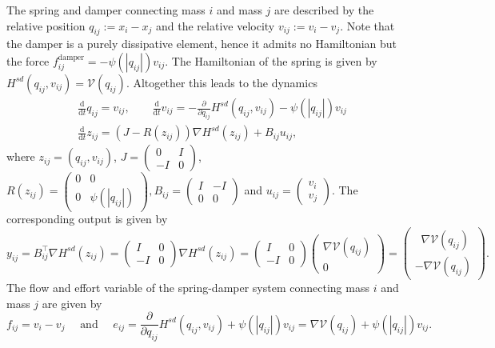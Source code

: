 \documentclass[11pt]{article}
\newcommand{\calV}[0]{\mathcal V}
\newcommand{\dd}[0]{\mathrm d}
\begin{document}
\begin{bibunit}[abbrv]
The spring and damper connecting mass $i$ and mass $j$ are described by the relative position $q_{ij}:=x_i-x_j$ and the relative velocity $v_{ij} := v_i - v_j$. Note that the damper is a purely dissipative element, hence it admits no Hamiltonian but the force $f_{ij}^\mathrm{damper} = -\psi(|q_{ij}|)v_{ij}$. The Hamiltonian of the spring is given by $H^{sd}(q_{ij},v_{ij}) = \calV(q_{ij})$. Altogether this leads to the dynamics
\begin{align*}
&\frac{\dd}{\dd t} q_{ij} = v_{ij}, \qquad \frac{\dd}{\dd t} v_{ij} = -\frac{\partial}{\partial q_{ij}} H^{sd}(q_{ij},v_{ij}) -\psi(|q_{ij}|)v_{ij} \\ 
&\frac{\dd}{\dd t}z_{ij} = (J - R(z_{ij})) \nabla H^{sd}(z_{ij}) + B_{ij}u_{ij},
\end{align*}
where $z_{ij}=(q_{ij},v_{ij})$, $J = \left(\begin{smallmatrix} 0&I\\-I  & 0\end{smallmatrix}\right)$, $R(z_{ij}) = \left(\begin{smallmatrix}0 & 0 \\ 0 & \psi(|q_{ij}|)\end{smallmatrix}\right), B_{ij} = \left(\begin{smallmatrix} I &  -I\\ 0&0\end{smallmatrix}\right)$ and $u_{ij} = \left(\begin{smallmatrix}v_i \\ v_j\end{smallmatrix}\right)$. The corresponding output is given by
\[
y_{ij} = B_{ij}^\top \nabla H^{sd}(z_{ij}) = \begin{pmatrix} I & 0 \\ -I&0\end{pmatrix} \nabla H^{sd}(z_{ij}) = \begin{pmatrix} I & 0 \\ -I&0\end{pmatrix} \begin{pmatrix} \nabla \calV(q_{ij}) \\0\end{pmatrix} = \begin{pmatrix} \;\; \nabla \calV(q_{ij}) \\ -\nabla \calV(q_{ij})\end{pmatrix}.
\]
%
The flow  and effort variable of the spring-damper system connecting mass $i$ and mass $j$ are given by  
 \[f_{ij} = v_i - v_j \quad \textrm{ and } \quad  e_{ij} = \frac{\partial}{\partial q_{ij}} H^{sd}(q_{ij},v_{ij})+\psi(|q_{ij}|)v_{ij}=\nabla \calV(q_{ij})+\psi(|q_{ij}|)v_{ij}.\]


\end{bibunit}
\end{document}
